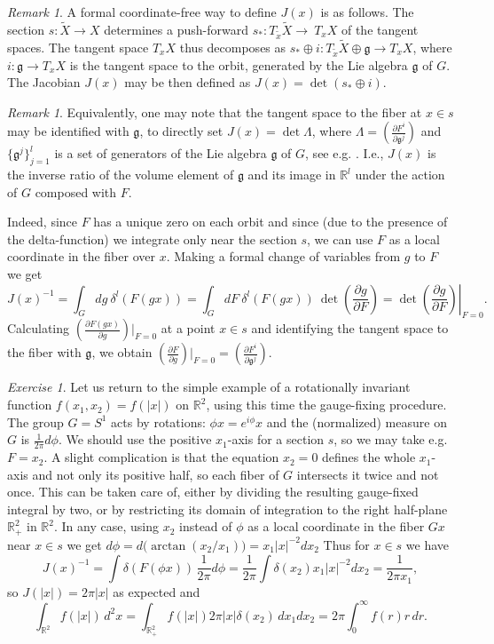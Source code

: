 \documentclass[10pt]{amsart}
\theoremstyle{definition}
\theoremstyle{remark}
\newtheorem{rem}[thm]{Remark}
\newtheorem{exs}[thm]{Exercise}
\newcommand{\R}{\mathbb R}
\newcommand{\dd}{\partial}
\newcommand{\fG}{\mathfrak{g}}
\newcommand{\tX}{\widetilde{X}}
\newcommand{\Gd}{\delta}
\newcommand{\GL}{\Lambda}
\begin{document}
\begin{rem}
A formal coordinate-free way to define $J(x)$ is as follows.
The section $s:\tX\to X$ determines a push-forward
$s_*:T_{\tilde{x}}\tX \to\ T_x X$ of the tangent spaces.
The tangent space $T_x X$ thus decomposes as
$s_*\oplus i:T_{\tilde{x}}\tX\oplus\fG \to T_x X$, where
$i:\fG\to T_x X$ is the tangent space to the orbit,
generated by the Lie algebra $\fG$ of $G$.
The Jacobian $J(x)$ may be then defined as
$J(x)=\det(s_*\oplus i)$.
\end{rem}

\begin{rem}
Equivalently, one may note that the tangent space to the fiber at
$x\in s$ may be identified with $\fG$, to directly set
$J(x)=\det \GL $, where $\GL=(\frac{\dd F^i}{\dd \fG^j})$ and
$\{\fG^j\}_{j=1}^l$ is a set of generators of the Lie algebra
$\fG$ of $G$, see e.g. \cite{BN}.
I.e., $J(x)$ is the inverse ratio of the volume element of
$\fG$ and its image in $\R^l$ under the action of $G$ composed
with $F$.

Indeed, since $F$ has a unique zero on each orbit and since (due
to the presence of the delta-function) we integrate only near the
section $s$, we can use $F$ as a local coordinate in the fiber
over $x$. Making a formal change of variables from $g$ to $F$ we get
$$
J(x)^{-1}=\int_Gdg\ \Gd^l(F(gx))=\int_GdF\ \Gd^l(F(gx))\
\left. \det\left(\frac{\dd g}{\dd F}\right)=\det\left(\frac{\dd g}{\dd F}\right)\right|_{F=0}.
$$
Calculating $(\frac{\dd F(gx)}{\dd g})\big|_{F=0}$ at a point $x\in s$
and identifying the tangent space to the fiber with $\fG$, we obtain
$(\frac{\dd F}{\dd g})\big|_{F=0}=(\frac{\dd F^i}{\dd \fG^j})$.
\end{rem}

\begin{exs}
Let us return to the simple example of a rotationally invariant
function $f(x_1,x_2)=f(|x|)$ on $\R^2$, using this time the
gauge-fixing procedure.
The group $G=S^1$ acts by rotations: $\phi x=e^{i\phi}x$ and the
(normalized) measure on $G$ is $\frac1{2\pi}d\phi$.
We should use the positive $x_1$-axis for a section $s$, so we
may take e.g. $F=x_2$.
A slight complication is that the equation $x_2=0$ defines the
whole $x_1$-axis and not only its positive half, so each fiber of
$G$ intersects it twice and not once. This can be taken care of,
either by dividing the resulting gauge-fixed integral by two, or
by restricting its domain of integration to the right half-plane
$\R_+^2$ in $\R^2$.
In any case, using $x_2$ instead of $\phi$ as a local coordinate
in the fiber $Gx$ near $x\in s$ we get
$d\phi=d\big(\arctan(x_2/x_1)\big)=x_1 |x|^{-2} dx_2$
Thus for $x\in s$ we have
$$
J(x)^{-1}=\int \Gd(F(\phi x))\, \frac1{2\pi}d\phi=
\frac1{2\pi}\int \Gd(x_2) x_1 |x|^{-2}dx_2=\frac1{2\pi x_1} ,
$$
so $J(|x|)=2\pi |x|$ as expected and
$$
\int_{\R^2}f(|x|)\, d^2x=\int_{\R_+^2}f(|x|)2\pi|x|\Gd(x_2)\,
dx_1 dx_2=2\pi\int_0^\infty f(r) r\, dr .
$$
\end{exs}
\end{document}
